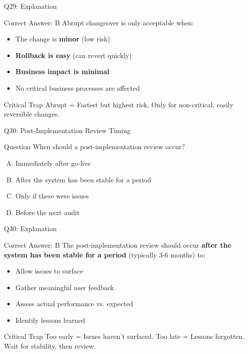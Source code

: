 \documentclass{beamer}
\begin{document}
	\begin{frame}{Q29: Explanation}
		\begin{block}{Correct Answer: B}
			Abrupt changeover is only acceptable when:
			\begin{itemize}
				\item The change is \textbf{minor} (low risk)
				\item \textbf{Rollback is easy} (can revert quickly)
				\item \textbf{Business impact is minimal}
				\item No critical business processes are affected
			\end{itemize}
		\end{block}
		\begin{alertblock}{Critical Trap}
			Abrupt = Fastest but highest risk.
			Only for non-critical, easily reversible changes.
		\end{alertblock}
	\end{frame}
	
	\begin{frame}{Q30: Post-Implementation Review Timing}
		\begin{block}{Question}
			When should a post-implementation review occur?
		\end{block}
		\begin{enumerate}[(A)]
			\item Immediately after go-live
			\item After the system has been stable for a period
			\item Only if there were issues
			\item Before the next audit
		\end{enumerate}
	\end{frame}
	
	\begin{frame}{Q30: Explanation}
		\begin{block}{Correct Answer: B}
			The post-implementation review should occur \textbf{after the system has been stable for a period} (typically 3-6 months) to:
			\begin{itemize}
				\item Allow issues to surface
				\item Gather meaningful user feedback
				\item Assess actual performance vs. expected
				\item Identify lessons learned
			\end{itemize}
		\end{block}
		\begin{alertblock}{Critical Trap}
			Too early = Issues haven't surfaced.
			Too late = Lessons forgotten.
			Wait for stability, then review.
		\end{alertblock}
	\end{frame}
	
\end{document}
